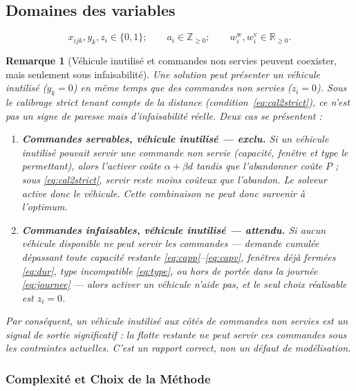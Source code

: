 \documentclass[12pt,a4paper]{report}
\newcommand{\R}{\mathbb{R}}
\newcommand{\Zp}{\mathbb{Z}_{\geq 0}}
\newtheorem{remarque}{Remarque}
\begin{document}
\subsection{Domaines des variables}

\begin{equation}
  x_{ijk}, y_k, z_i \in \{0,1\}; \qquad
  a_i \in \Zp; \qquad
  w_i^{\mathrm w}, w_i^{\mathrm v} \in \R_{\geq 0}.
\end{equation}

\begin{remarque}[Véhicule inutilisé et commandes non servies peuvent coexister, mais seulement sous infaisabilité]
\label{rem:inutilise}
Une solution peut présenter un véhicule inutilisé ($y_k = 0$) en même temps
que des commandes non servies ($z_i = 0$). Sous le calibrage strict tenant
compte de la distance (condition~\eqref{eq:cal2strict}), ce n'est \emph{pas}
un signe de paresse mais d'infaisabilité réelle. Deux cas se présentent :
\begin{enumerate}[leftmargin=2.2em]
  \item \textbf{Commandes servables, véhicule inutilisé --- exclu.} Si un
        véhicule inutilisé pouvait servir une commande non servie (capacité,
        fenêtre et type le permettant), alors l'activer coûte $\alpha +
        \beta d$ tandis que l'abandonner coûte $P$ ; sous
        \eqref{eq:cal2strict}, servir reste moins coûteux que l'abandon. Le
        solveur active donc le véhicule. Cette combinaison ne peut donc
        survenir à l'optimum.
  \item \textbf{Commandes infaisables, véhicule inutilisé --- attendu.} Si
        aucun véhicule disponible ne peut servir les commandes --- demande
        cumulée dépassant toute capacité restante \eqref{eq:capp}--\eqref{eq:capv},
        fenêtres déjà fermées \eqref{eq:dur}, type incompatible
        \eqref{eq:type}, ou hors de portée dans la journée \eqref{eq:journee}
        --- alors activer un véhicule n'aide pas, et le seul choix réalisable
        est $z_i = 0$.
\end{enumerate}
Par conséquent, un véhicule inutilisé aux côtés de commandes non servies est
un \emph{signal de sortie} significatif : la flotte restante ne peut servir
ces commandes sous les contraintes actuelles. C'est un rapport correct, non
un défaut de modélisation.
\end{remarque}

\subsubsection{Complexité et Choix de la Méthode}
\end{document}
